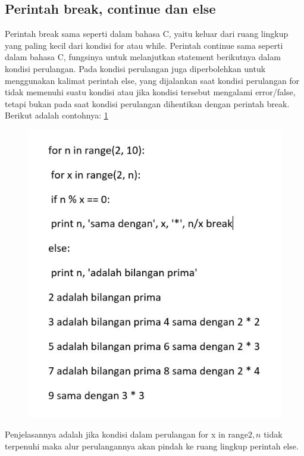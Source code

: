 \subsection{Perintah break, continue dan else}
 Perintah break sama seperti dalam bahasa C, yaitu keluar dari ruang lingkup yang paling kecil dari
kondisi for atau while.
Perintah continue sama  seperti dalam bahasa C, fungsinya untuk melanjutkan statement
berikutnya dalam kondisi perulangan.
Pada kondisi perulangan juga diperbolehkan untuk menggunakan kalimat perintah else, yang dijalankan saat kondisi perulangan for tidak memenuhi suatu kondisi atau jika kondisi tersebut mengalami error/false, tetapi bukan pada saat kondisi perulangan dihentikan dengan perintah break. Berikut adalah contohnya:
\ref{2bce}

\begin{figure}[ht]
    \centerline{\includegraphics[width=1\textwidth]{figures/2bce.JPG}}
    \caption{}
    \label{2bce}
    \end{figure}

Penjelasannya adalah jika kondisi dalam perulangan for x in range\(2, n\) tidak terpenuhi maka alur perulangannya akan pindah ke ruang lingkup perintah else. 

